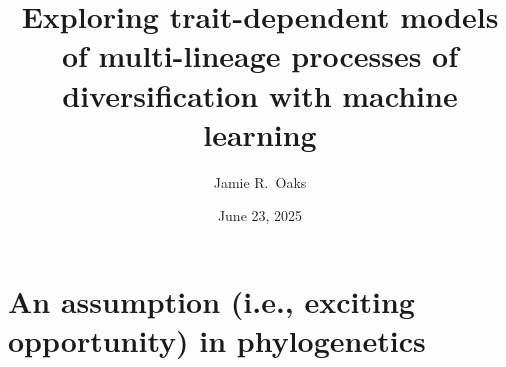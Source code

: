 





% 

\usepackage{lmodern}
\usepackage{bm}
\usepackage{pdfpages}

\usepackage{appendixnumberbeamer}


\renewcommand\footnoterule{}

\title[Trait-dependent shared divergences]{Exploring trait-dependent models of multi-lineage processes of diversification with machine learning}

\author[Jamie Oaks]{
    Jamie R.\ Oaks
}

\date{June 23, 2025}






\section{An assumption (i.e., exciting opportunity) in phylogenetics}




\begin{frame}
    
\end{frame}




